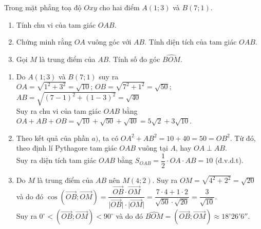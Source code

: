 \begin{bt}%
	Trong mặt phẳng toạ độ $Oxy$ cho hai điểm $A(1;3)$ và $B(7;1)$.
	\begin{enumerate}
		\item Tính chu vi của tam giác $OAB$.
		\item Chứng minh rằng $OA$ vuông góc với $AB$. Tính diện tích của tam giác $OAB$.
		\item Gọi $M$ là trung điểm của $AB$. Tính số đo góc $\widehat{BOM}$.
	\end{enumerate}
	\loigiai
	{
		\begin{enumerate}
			\item Do $A(1;3)$ và $B(7;1)$ suy ra \\
			$OA=\sqrt{1^2+3^2}=\sqrt{10}$; $O B=\sqrt{7^2+1^2}=\sqrt{50}$; $A B=\sqrt{(7-1)^2+(1-3)^2}=\sqrt{40}$\\
			Suy ra chu vi của tam giác $O A B$ bằng\\
			$OA+AB+OB=\sqrt{10}+\sqrt{50}+\sqrt{40}=5\sqrt{2}+3\sqrt{10}$.
			\item Theo kết quả của phần $a)$, ta có $OA^2+AB^2=10+40=50=OB^2$. Từ đó, theo định lí Pythagore tam giác $OAB$ vuông tại $A$, hay $OA\perp AB$.\\
			Suy ra diện tích tam giác $OAB$ bằng $S_{OAB}=\dfrac{1}{2}\cdot OA\cdot AB=10$ (đ.v.d.t).
			\item Do $M$ là trung điểm của $AB$ nên $M(4;2)$. Suy ra $OM=\sqrt{4^2+2^2}=\sqrt{20}$ và do đó $\cos\left(\overrightarrow{OB};\overrightarrow{OM}\right)=\dfrac{\overrightarrow{OB}\cdot\overrightarrow{OM}}{\big|\overrightarrow{OB}\big|\cdot\big|\overrightarrow{OM}\big|}=\dfrac{7\cdot 4+1\cdot 2}{\sqrt{50}\cdot\sqrt{20}}=\dfrac{3}{\sqrt{10}}$.\\
			Suy ra $0^\circ<\left(\overrightarrow{OB};\overrightarrow{OM}\right)<90^\circ$ và do đó $\widehat{BOM}=\left(\overrightarrow{OB};\overrightarrow{OM}\right)\approx 18^\circ 26'6''$.
		\end{enumerate}
	}
\end{bt}


